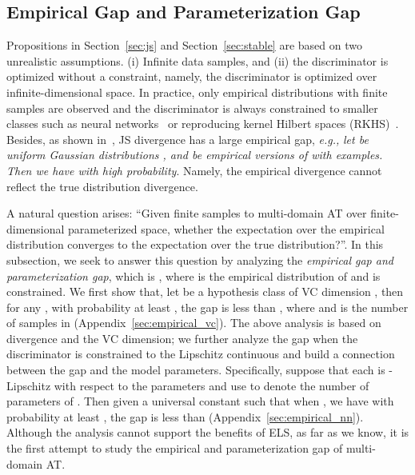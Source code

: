 \documentclass{article} \usepackage{iclr2023_conference,times}
\newcommand{\ls}[0]{ELS\xspace}
\newcommand{\eg}[0]{\textit{e.g., }}
\begin{document}
\subsection{Empirical Gap and Parameterization Gap}\label{sec:empirical:gap}
\vspace{-0.15cm}
Propositions in Section~\ref{sec:js} and Section~\ref{sec:stable} are based on two  unrealistic assumptions. (i) Infinite data samples, and (ii) the discriminator is optimized without a constraint, namely, the discriminator is optimized over infinite-dimensional space. In practice, only empirical distributions with finite samples are observed and the discriminator is always constrained to smaller classes such as neural networks~\citep{goodfellow2014generative} or reproducing kernel Hilbert spaces (RKHS)~\citep{li2017mmd}. Besides, as shown in~\citep{arora2017generalization,schfer2019implicit}, JS divergence has a large empirical gap, \eg \textit{let  be uniform Gaussian distributions , and  be empirical versions of  with  examples. Then we have  with high probability}. Namely, the empirical divergence cannot reflect the true distribution divergence.

A natural question arises: ``Given finite samples to multi-domain AT over finite-dimensional parameterized space, whether the expectation over the empirical distribution converges to the expectation over the true distribution?''. In this subsection, we seek to answer this question by analyzing the \textit{empirical gap and parameterization gap}, which is , where  is the empirical distribution of  and  is constrained. We first show that, let  be a hypothesis class of VC dimension , then for any , with probability at least , the gap is less than , where  and  is the number of samples in  (Appendix~\ref{sec:empirical_vc}). The above analysis is based on  divergence and the VC dimension; we further analyze the gap when the discriminator is constrained to the Lipschitz continuous and build a connection between the gap and the model parameters. Specifically, suppose that each  is -Lipschitz with respect to the parameters and use  to denote the number of parameters of . Then given a universal constant  such that when , we have with probability at least , the gap is less than  (Appendix~\ref{sec:empirical_nn}). Although the analysis cannot support the benefits of \ls, as far as we know, it is the first attempt to study the empirical and parameterization gap of multi-domain AT.

\vspace{-0.15cm}
\end{document}
